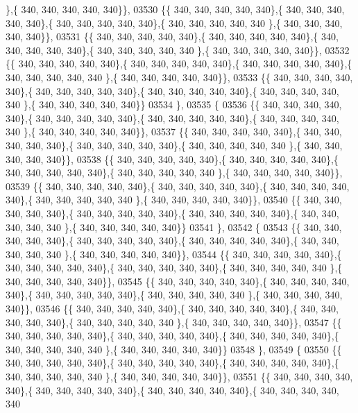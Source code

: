 \begin{DoxyCode}
      \},\{ 340, 340, 340, 340, 340\}\},
03530 \{\{ 340, 340, 340, 340, 340\},\{ 340, 340, 340, 340, 340\},\{ 340, 340, 340, 340, 340\},\{ 340, 340, 340, 340, 340
      \},\{ 340, 340, 340, 340, 340\}\},
03531 \{\{ 340, 340, 340, 340, 340\},\{ 340, 340, 340, 340, 340\},\{ 340, 340, 340, 340, 340\},\{ 340, 340, 340, 340, 340
      \},\{ 340, 340, 340, 340, 340\}\},
03532 \{\{ 340, 340, 340, 340, 340\},\{ 340, 340, 340, 340, 340\},\{ 340, 340, 340, 340, 340\},\{ 340, 340, 340, 340, 340
      \},\{ 340, 340, 340, 340, 340\}\},
03533 \{\{ 340, 340, 340, 340, 340\},\{ 340, 340, 340, 340, 340\},\{ 340, 340, 340, 340, 340\},\{ 340, 340, 340, 340, 340
      \},\{ 340, 340, 340, 340, 340\}\}
03534 \},
03535 \{
03536 \{\{ 340, 340, 340, 340, 340\},\{ 340, 340, 340, 340, 340\},\{ 340, 340, 340, 340, 340\},\{ 340, 340, 340, 340, 340
      \},\{ 340, 340, 340, 340, 340\}\},
03537 \{\{ 340, 340, 340, 340, 340\},\{ 340, 340, 340, 340, 340\},\{ 340, 340, 340, 340, 340\},\{ 340, 340, 340, 340, 340
      \},\{ 340, 340, 340, 340, 340\}\},
03538 \{\{ 340, 340, 340, 340, 340\},\{ 340, 340, 340, 340, 340\},\{ 340, 340, 340, 340, 340\},\{ 340, 340, 340, 340, 340
      \},\{ 340, 340, 340, 340, 340\}\},
03539 \{\{ 340, 340, 340, 340, 340\},\{ 340, 340, 340, 340, 340\},\{ 340, 340, 340, 340, 340\},\{ 340, 340, 340, 340, 340
      \},\{ 340, 340, 340, 340, 340\}\},
03540 \{\{ 340, 340, 340, 340, 340\},\{ 340, 340, 340, 340, 340\},\{ 340, 340, 340, 340, 340\},\{ 340, 340, 340, 340, 340
      \},\{ 340, 340, 340, 340, 340\}\}
03541 \},
03542 \{
03543 \{\{ 340, 340, 340, 340, 340\},\{ 340, 340, 340, 340, 340\},\{ 340, 340, 340, 340, 340\},\{ 340, 340, 340, 340, 340
      \},\{ 340, 340, 340, 340, 340\}\},
03544 \{\{ 340, 340, 340, 340, 340\},\{ 340, 340, 340, 340, 340\},\{ 340, 340, 340, 340, 340\},\{ 340, 340, 340, 340, 340
      \},\{ 340, 340, 340, 340, 340\}\},
03545 \{\{ 340, 340, 340, 340, 340\},\{ 340, 340, 340, 340, 340\},\{ 340, 340, 340, 340, 340\},\{ 340, 340, 340, 340, 340
      \},\{ 340, 340, 340, 340, 340\}\},
03546 \{\{ 340, 340, 340, 340, 340\},\{ 340, 340, 340, 340, 340\},\{ 340, 340, 340, 340, 340\},\{ 340, 340, 340, 340, 340
      \},\{ 340, 340, 340, 340, 340\}\},
03547 \{\{ 340, 340, 340, 340, 340\},\{ 340, 340, 340, 340, 340\},\{ 340, 340, 340, 340, 340\},\{ 340, 340, 340, 340, 340
      \},\{ 340, 340, 340, 340, 340\}\}
03548 \},
03549 \{
03550 \{\{ 340, 340, 340, 340, 340\},\{ 340, 340, 340, 340, 340\},\{ 340, 340, 340, 340, 340\},\{ 340, 340, 340, 340, 340
      \},\{ 340, 340, 340, 340, 340\}\},
03551 \{\{ 340, 340, 340, 340, 340\},\{ 340, 340, 340, 340, 340\},\{ 340, 340, 340, 340, 340\},\{ 340, 340, 340, 340, 340

\end{DoxyCode}
